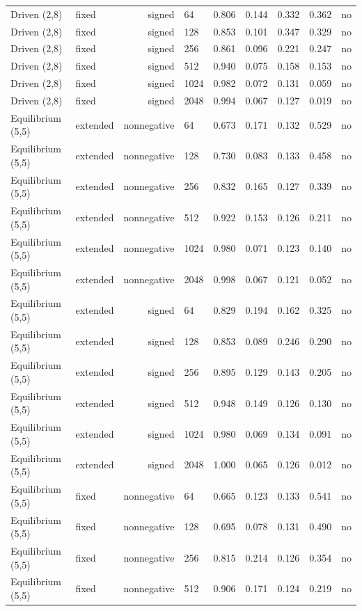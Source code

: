 \documentclass[10pt]{article}
\begin{document}
\begin{longtable}{llrlrrrrr}
Driven (2,8) & fixed & signed & 64 & 0.806 & 0.144 & 0.332 & 0.362 & no \\
Driven (2,8) & fixed & signed & 128 & 0.853 & 0.101 & 0.347 & 0.329 & no \\
Driven (2,8) & fixed & signed & 256 & 0.861 & 0.096 & 0.221 & 0.247 & no \\
Driven (2,8) & fixed & signed & 512 & 0.940 & 0.075 & 0.158 & 0.153 & no \\
Driven (2,8) & fixed & signed & 1024 & 0.982 & 0.072 & 0.131 & 0.059 & no \\
Driven (2,8) & fixed & signed & 2048 & 0.994 & 0.067 & 0.127 & 0.019 & no \\
Equilibrium (5,5) & extended & nonnegative & 64 & 0.673 & 0.171 & 0.132 & 0.529 & no \\
Equilibrium (5,5) & extended & nonnegative & 128 & 0.730 & 0.083 & 0.133 & 0.458 & no \\
Equilibrium (5,5) & extended & nonnegative & 256 & 0.832 & 0.165 & 0.127 & 0.339 & no \\
Equilibrium (5,5) & extended & nonnegative & 512 & 0.922 & 0.153 & 0.126 & 0.211 & no \\
Equilibrium (5,5) & extended & nonnegative & 1024 & 0.980 & 0.071 & 0.123 & 0.140 & no \\
Equilibrium (5,5) & extended & nonnegative & 2048 & 0.998 & 0.067 & 0.121 & 0.052 & no \\
Equilibrium (5,5) & extended & signed & 64 & 0.829 & 0.194 & 0.162 & 0.325 & no \\
Equilibrium (5,5) & extended & signed & 128 & 0.853 & 0.089 & 0.246 & 0.290 & no \\
Equilibrium (5,5) & extended & signed & 256 & 0.895 & 0.129 & 0.143 & 0.205 & no \\
Equilibrium (5,5) & extended & signed & 512 & 0.948 & 0.149 & 0.126 & 0.130 & no \\
Equilibrium (5,5) & extended & signed & 1024 & 0.980 & 0.069 & 0.134 & 0.091 & no \\
Equilibrium (5,5) & extended & signed & 2048 & 1.000 & 0.065 & 0.126 & 0.012 & no \\
Equilibrium (5,5) & fixed & nonnegative & 64 & 0.665 & 0.123 & 0.133 & 0.541 & no \\
Equilibrium (5,5) & fixed & nonnegative & 128 & 0.695 & 0.078 & 0.131 & 0.490 & no \\
Equilibrium (5,5) & fixed & nonnegative & 256 & 0.815 & 0.214 & 0.126 & 0.354 & no \\
Equilibrium (5,5) & fixed & nonnegative & 512 & 0.906 & 0.171 & 0.124 & 0.219 & no \\

\end{longtable}
\end{document}
